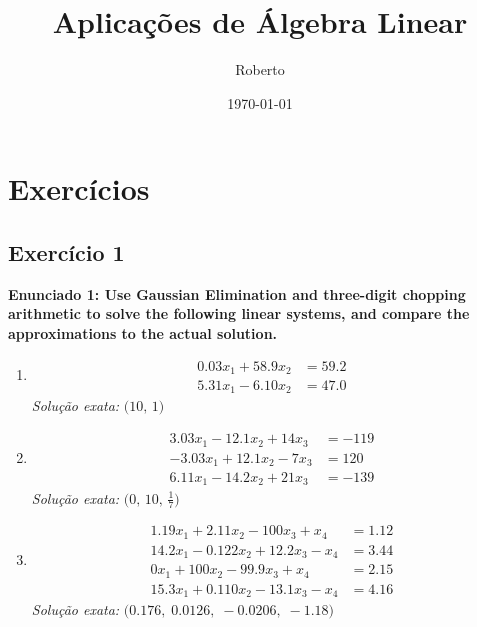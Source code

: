 \documentclass{article}
\title{Aplica\c{c}\~oes de \'Algebra Linear}
\author{Roberto}
\date{\today}
\begin{document}
\maketitle

\section*{Exerc\'icios}

\subsection*{Exerc\'icio 1}
\textbf{Enunciado 1: Use Gaussian Elimination and three-digit chopping arithmetic to solve the following linear systems, and compare the approximations to the actual solution.}

\begin{enumerate}
  \item
    \[
      \begin{aligned}
        0.03x_{1} + 58.9x_{2} &= 59.2 \\
        5.31x_{1} -  6.10x_{2} &= 47.0
      \end{aligned}
    \]
    \textit{Solu\c{c}\~ao exata:} $\bigl(10,\,1\bigr)$

  \item
    \[
      \begin{aligned}
        3.03x_{1} - 12.1x_{2} + 14x_{3} &= -119 \\
       -3.03x_{1} + 12.1x_{2} -  7x_{3} &=  120 \\
        6.11x_{1} - 14.2x_{2} + 21x_{3} &= -139
      \end{aligned}
    \]
    \textit{Solu\c{c}\~ao exata:} $\bigl(0,\,10,\,\tfrac17\bigr)$

  \item
    \[
      \begin{aligned}
        1.19x_{1} +   2.11x_{2} - 100x_{3} +  x_{4} &= 1.12 \\
       14.2x_{1}  -  0.122x_{2} + 12.2x_{3} - x_{4} &= 3.44 \\
       0x_{1} + 100x_{2}  - 99.9x_{3}  +  x_{4}             &= 2.15 \\
       15.3x_{1}  + 0.110x_{2} - 13.1x_{3} - x_{4}  &= 4.16
      \end{aligned}
    \]
    \textit{Solu\c{c}\~ao exata:} $\bigl(0.176,\;0.0126,\;-0.0206,\;-1.18\bigr)$
\end{enumerate}
\end{document}
